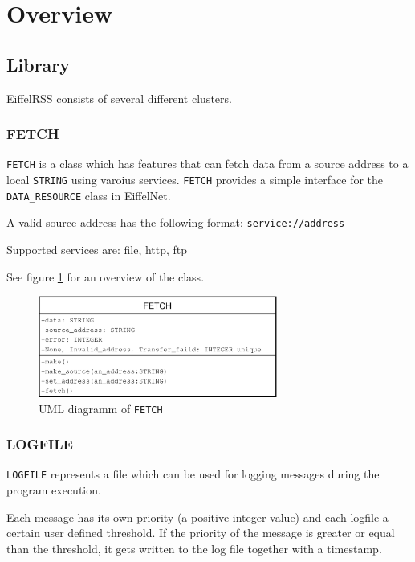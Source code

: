 \documentclass[a4paper,fleqn,titlepage]{article}
\begin{document}
\section{Overview}
\label{sec:overview}


\subsection{Library}
\label{sec:library}

EiffelRSS consists of several different clusters.


\subsubsection{FETCH}

\texttt{FETCH} is a class which has features that can fetch data from
a source address to a local \texttt{STRING} using varoius services.
\texttt{FETCH} provides a simple interface for the
\texttt{DATA\_RESOURCE} class in EiffelNet.

A valid source address has the following format:
\texttt{service://address}

Supported services are: file, http, ftp

See figure \ref{fig:fetch} for an overview of the class.

\begin{figure}[htbp]
  \centering
  \includegraphics[width=0.7\textwidth]{./figures/fetch}
  \caption{UML diagramm of \texttt{FETCH}}
  \label{fig:fetch}
\end{figure}


\subsubsection{LOGFILE}

\texttt{LOGFILE} represents a file which can be used for logging
messages during the program execution.

Each message has its own priority (a positive integer value) and each
logfile a certain user defined threshold. If the priority of the
message is greater or equal than the threshold, it gets written to the
log file together with a timestamp.
\end{document}
